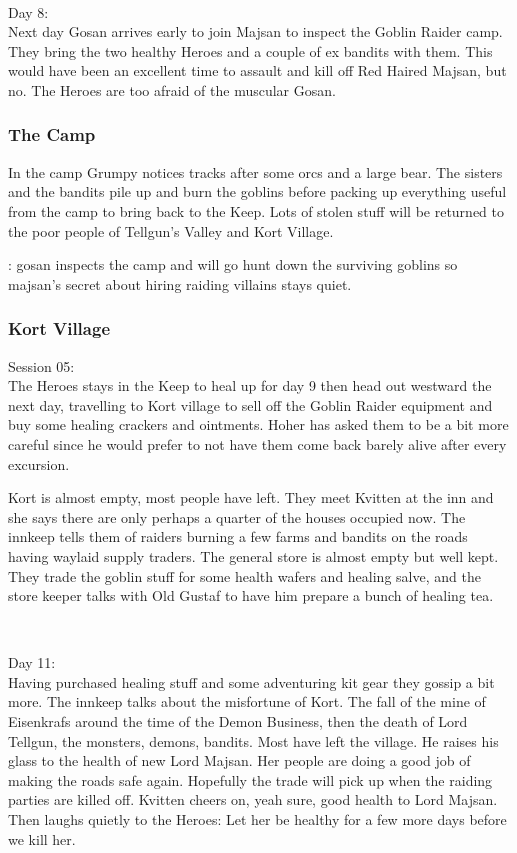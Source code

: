\

Day 8:\\
Next day Gosan arrives early to join Majsan to inspect the Goblin Raider camp. They bring the two healthy Heroes and a couple of ex bandits with them. This would have been an excellent time to assault and kill off Red Haired Majsan, but no. The Heroes are too afraid of the muscular Gosan.


\subsubsection*{The Camp}
In the camp Grumpy notices tracks after some orcs and a large bear. The sisters and the bandits pile up and burn the goblins before packing up everything useful from the camp to bring back to the Keep. Lots of stolen stuff will be returned to the poor people of Tellgun's Valley and Kort Village.

\begin{readoutloud}
\todo: gosan inspects the camp and will go hunt down the surviving goblins so majsan's secret about hiring raiding villains stays quiet.
\end{readoutloud}


\subsubsection*{Kort Village}
\forceindent Session 05:\\                                              %

The Heroes stays in the Keep to heal up for day 9 then head out westward the next day, travelling to Kort village to sell off the Goblin Raider equipment and buy some healing crackers and ointments. Hoher has asked them to be a bit more careful since he would prefer to not have them come back barely alive after every excursion.

Kort is almost empty, most people have left. They meet Kvitten at the inn and she says there are only perhaps a quarter of the houses occupied now. The innkeep tells them of raiders burning a few farms and bandits on the roads having waylaid supply traders. The general store is almost empty but well kept. They trade the goblin stuff for some health wafers and healing salve, and the store keeper talks with Old Gustaf to have him prepare a bunch of healing tea.

\

Day 11:\\
Having purchased healing stuff and some adventuring kit gear they gossip a bit more.
The innkeep talks about the misfortune of Kort. The fall of the mine of Eisenkrafs around the time of the Demon Business, then the death of Lord Tellgun, the monsters, demons, bandits. Most have left the village. He raises his glass to the health of new Lord Majsan. Her people are doing a good job of making the roads safe again. Hopefully the trade will pick up when the raiding parties are killed off.
Kvitten cheers on, yeah sure, good health to Lord Majsan. Then laughs quietly to the Heroes: Let her be healthy for a few more days before we kill her.



